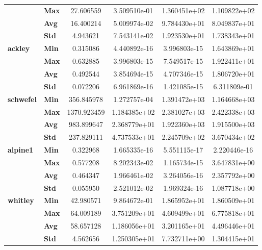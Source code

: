 \begin{longtable}{llcccc}
            & \textbf{Max} &    27.606559 &   3.509510e-01 &  1.360451e+02 &   1.109822e+02 \\
            & \textbf{Avg} &    16.400214 &   5.009974e-02 &  9.784430e+01 &   8.049837e+01 \\
            & \textbf{Std} &     4.943621 &   7.543141e-02 &  1.923530e+01 &   1.738343e+01 \\
\cline{1-6}
\multirow{4}{*}{\textbf{ackley}} & \textbf{Min} &     0.315086 &   4.440892e-16 &  3.996803e-15 &   1.643869e+01 \\
            & \textbf{Max} &     0.632885 &   3.996803e-15 &  7.549517e-15 &   1.922411e+01 \\
            & \textbf{Avg} &     0.492544 &   3.854694e-15 &  4.707346e-15 &   1.806720e+01 \\
            & \textbf{Std} &     0.072206 &   6.961869e-16 &  1.421085e-15 &   6.311809e-01 \\
\cline{1-6}
\multirow{4}{*}{\textbf{schwefel}} & \textbf{Min} &   356.845978 &   1.272757e-04 &  1.391472e+03 &   1.164668e+03 \\
            & \textbf{Max} &  1370.923459 &   1.184385e+02 &  2.381027e+03 &   2.422338e+03 \\
            & \textbf{Avg} &   983.899647 &   2.368779e+01 &  1.922360e+03 &   1.915500e+03 \\
            & \textbf{Std} &   237.829111 &   4.737533e+01 &  2.245709e+02 &   3.670434e+02 \\
\cline{1-6}
\multirow{4}{*}{\textbf{alpine1}} & \textbf{Min} &     0.322968 &   1.665335e-16 &  5.551115e-17 &   2.220446e-16 \\
            & \textbf{Max} &     0.577208 &   8.202343e-02 &  1.165734e-15 &   3.647831e+00 \\
            & \textbf{Avg} &     0.464347 &   1.966461e-02 &  3.264056e-16 &   2.357792e+00 \\
            & \textbf{Std} &     0.055950 &   2.521012e-02 &  1.969324e-16 &   1.087718e+00 \\
\cline{1-6}
\multirow{4}{*}{\textbf{whitley}} & \textbf{Min} &    42.980571 &   9.864672e-01 &  1.865952e+01 &   1.860509e+01 \\
            & \textbf{Max} &    64.009189 &   3.751209e+01 &  4.609499e+01 &   6.775818e+01 \\
            & \textbf{Avg} &    58.657128 &   1.186056e+01 &  3.201165e+01 &   4.496446e+01 \\
            & \textbf{Std} &     4.562656 &   1.250305e+01 &  7.732711e+00 &   1.304415e+01 \\

\end{longtable}
